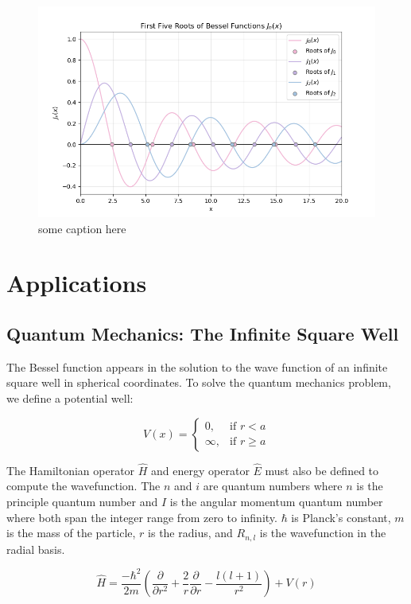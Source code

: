 \documentclass[linenumbers, RNAAS, trackchanges]{aastex631}
\begin{document}
\begin{figure}[H]
    \centering
    \includegraphics[width=0.70\linewidth]{bessel_roots.png}
    \caption{some caption here}
    \label{fig:bessel_roots}
\end{figure}



\section{Applications} \label{sec:applications}

\subsection{Quantum Mechanics: The Infinite Square Well}
The Bessel function appears in the solution to the wave function of an infinite
square well in spherical coordinates. To solve the quantum mechanics problem, we
define a potential well:

\begin{equation}
    V(x)=
    \begin{cases}
        0, &\text{if }r < a\\
        \infty, &\text{if }r\geq a
    \end{cases}
\end{equation}

The Hamiltonian operator $\hat{H}$ and energy operator $\hat{E}$ must also be
defined to compute the wavefunction. The $n$ and $i$ are quantum numbers where $n$
is the principle quantum number and $I$ is the angular momentum quantum number where
both span the integer range from zero to infinity. $\hbar$ is Planck's constant, $m$
is the mass of the particle, $r$ is the radius, and $R_{n,l}$ is the wavefunction in
the radial basis.

\begin{equation}
    \hat{H}=\frac{-\hbar ^2}{2m}\left(\frac{\partial}{\partial r^2} + \frac{2}{r} \frac{\partial}{\partial r} - \frac{l(l+1)}{r^2}\right) +V(r)
\end{equation}
\end{document}
